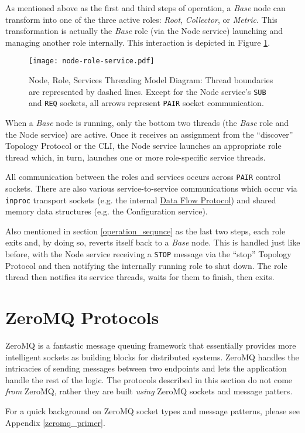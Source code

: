 As mentioned above as the first and third steps of \dcamp operation, a \textit{Base} node can transform into one of the
three active \dcamp roles: \textit{Root}, \textit{Collector}, or \textit{Metric}. This transformation is actually the
\textit{Base} role (via the Node service) launching and managing another role internally. This interaction is depicted
in Figure \ref{fig:node_role_service_image}.

\begin{figure}[H]
    \centering
    \texttt{[image: node-role-service.pdf]}
    \caption[Node, Role, Services Threading Model Diagram]
            {Node, Role, Services Threading Model Diagram: Thread boundaries are represented by dashed lines. Except for
	     the Node service's \texttt{SUB} and \texttt{REQ} sockets, all arrows represent \texttt{PAIR} socket
	     communication.}
    \label{fig:node_role_service_image}
\end{figure}

When a \textit{Base} node is running, only the bottom two threads (the \textit{Base} role and the Node service) are
active. Once it receives an assignment from the ``discover'' Topology Protocol or the \dcamp CLI, the Node service
launches an appropriate role thread which, in turn, launches one or more role-specific service threads.

All communication between the roles and services occurs across \texttt{PAIR} control sockets. There are also various
service-to-service communications which occur via \texttt{inproc} transport sockets (e.g. the internal
\hyperref[proto_data]{Data Flow Protocol}) and shared memory data structures (e.g. the Configuration service).

Also mentioned in section \ref{operation_sequnce} as the last two steps, each role exits and, by doing so, reverts
itself back to a \textit{Base} node. This is handled just like before, with the Node service receiving a \texttt{STOP}
message via the ``stop'' Topology Protocol and then notifying the internally running role to shut down. The role thread
then notifies its service threads, waits for them to finish, then exits.

\section{ZeroMQ Protocols}

ZeroMQ is a fantastic message queuing framework that essentially provides more intelligent sockets as building blocks
for distributed systems. ZeroMQ handles the intricacies of sending messages between two endpoints and lets the
application handle the rest of the logic. The protocols described in this section do not come \textit{from} ZeroMQ,
rather they are built \textit{using} ZeroMQ sockets and message patters.

For a quick background on ZeroMQ socket types and message patterns, please see Appendix \ref{zeromq_primer}.






